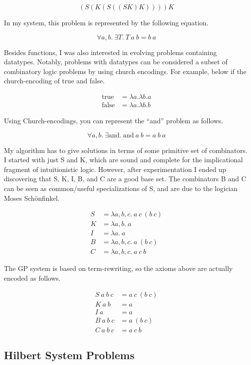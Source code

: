 \documentclass{article}
\newcommand{\n}[1]{\textrm{#1}}
\begin{document}
$$
(S(K(S((SK)K))))K
$$

In my system, this problem is represented by the following equation.

$$
\forall a,b . ~ \exists T . ~ T ~ a ~ b = b ~ a
$$

Besides functions, I was also interested in evolving problems
containing datatypes. Notably, problems with datatypes can be
considered a subset of combinatory logic problems by using church
encodings. For example, below if the church-encoding of true and
false.

\begin{align*}
\n{true} &= \lambda a. \lambda b. a\\
\n{false} &= \lambda a. \lambda b. b
\end{align*}

Using Church-encodings, you can represent the ``and'' problem as
follows.

$$
\forall a,b . ~ \exists \n{and} . ~ \n{and} ~ a ~ b = a ~ b ~ a
$$

My algorithm has to give solutions in terms of some primitive set of
combinators. I started with just S and K, which are sound and complete
for the implicational fragment of intuitionistic logic. However, after
experimentation I ended up discovering that S, K, I, B, and C are a
good base set. The combinators B and C can be seen as common/useful
specializations of S, and are due to the logician Moses Sch{\"o}nfinkel.

\begin{align*}
S &= \lambda a,b,c . ~ a ~ c ~ (b ~ c)\\
K &= \lambda a,b . ~ a\\
I &= \lambda a . ~ a\\
B &= \lambda a,b,c . ~ a ~ (b ~ c)\\
C &= \lambda a,b,c . ~ a ~ c ~ b
\end{align*}

The GP system is based on term-rewriting, so the axioms above are
actually encoded as follows.

\begin{align*}
S ~ a ~ b ~ c &= a ~ c ~ (b ~ c)\\
K ~ a ~ b &= a\\
I ~ a &= a\\
B ~ a ~ b ~ c &= a ~ (b ~ c)\\
C ~ a ~ b ~ c &= a ~ c ~ b
\end{align*}


\subsection{Hilbert System Problems}
\end{document}
